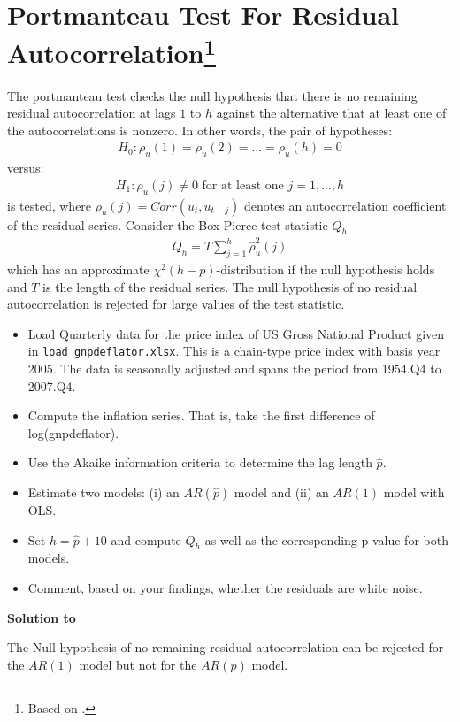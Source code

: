 \documentclass[a4paper]{scrartcl}
\begin{document}
    \section[Portmanteau Test For Residual Autocorrelation]{Portmanteau Test For Residual Autocorrelation\footnote{Based on \citet{Luetkepohl.2004}.}}\label{ex:Portmanteau}
    The portmanteau test checks the null hypothesis that there is no remaining residual autocorrelation at lags $1$ to $h$ against the alternative that at least one of the autocorrelations is nonzero. In other words, the pair of hypotheses:
    \begin{align*}
        H_0:\rho_u(1)=\rho_u(2)=...=\rho_u(h) = 0
    \end{align*}
    versus:
    \begin{align*}
        H_1:\rho_u(j)\neq 0 \text{ for at least one }j=1,...,h
    \end{align*}
    is tested, where $\rho_u(j) = Corr(u_t, u_{t-j})$ denotes an autocorrelation coefficient of
    the residual series. Consider the Box-Pierce test statistic $Q_h$
    \begin{align*}
        Q_h = T \sum_{j=1}^h \hat{\rho}^2_u(j)
    \end{align*}
    which has an approximate $\chi^2(h-p)$-distribution if the null hypothesis holds and $T$ is the length of the residual series. The null hypothesis of no residual autocorrelation is rejected for large values of the test statistic. 
    
    \begin{itemize}
        \item Load Quarterly data for the price index of US Gross National Product given in \texttt{load gnpdeflator.xlsx}. This is a chain-type price index with basis year 2005. The data is seasonally adjusted and spans the period from 1954.Q4 to 2007.Q4.
        \item Compute the inflation series. That is, take the first difference of log(gnpdeflator).
        \item Use the Akaike information criteria to determine the lag length $\hat{p}$.
        \item Estimate two models: (i) an $AR(\hat{p})$ model and (ii) an $AR(1)$ model with OLS.
        \item Set $h=\hat{p}+10$ and compute $Q_h$ as well as the corresponding p-value for both models.
        \item Comment, based on your findings, whether the residuals are white noise.
    \end{itemize}
    \begin{solution}\textbf{Solution to }
        
        The Null hypothesis of no remaining residual autocorrelation can be rejected for the $AR(1)$ model but not for the $AR(\hat{p})$ model.
        \newpage %
    \end{solution}
    
\end{document}
